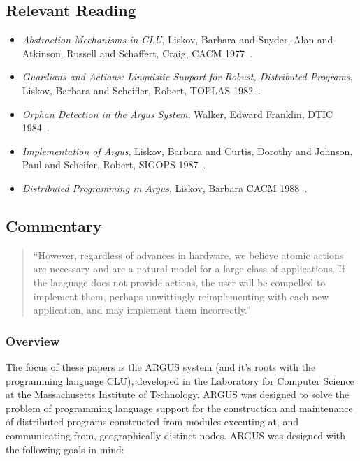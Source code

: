 \subsection{Relevant Reading}

\begin{itemize}
	\item \textit{Abstraction Mechanisms in CLU}, Liskov, Barbara and Snyder, Alan and Atkinson, Russell and Schaffert, Craig, CACM 1977~\cite{liskov1977abstraction}.
	\item \textit{Guardians and Actions: Linguistic Support for Robust, Distributed Programs}, Liskov, Barbara and Scheifler, Robert, TOPLAS 1982~\cite{liskov1983guardians}.
	\item \textit{Orphan Detection in the Argus System}, Walker, Edward Franklin, DTIC 1984~\cite{walker1984orphan}.
	\item \textit{Implementation of Argus}, Liskov, Barbara and Curtis, Dorothy and Johnson, Paul and Scheifer, Robert, SIGOPS 1987~\cite{liskov1987implementation}.
	\item \textit{Distributed Programming in Argus}, Liskov, Barbara  CACM 1988~\cite{liskov1988distributed}.	
\end{itemize}

\subsection{Commentary}

\begin{quote}
``However, regardless of advances in hardware, we believe atomic actions are necessary and are a natural model for a large class of applications.  If the language does not provide actions, the user will be compelled to implement them, perhaps unwittingly reimplementing with each new application, and may implement them incorrectly.''	
\end{quote}

\subsubsection{Overview}

The focus of these papers is the ARGUS system (and it's roots with the programming language CLU), developed in the Laboratory for Computer Science at the Massachusetts Institute of Technology.  ARGUS was designed to solve the problem of programming language support for the construction and maintenance of distributed programs constructed from modules executing at, and communicating from, geographically distinct nodes.  ARGUS was designed with the following goals in mind:

